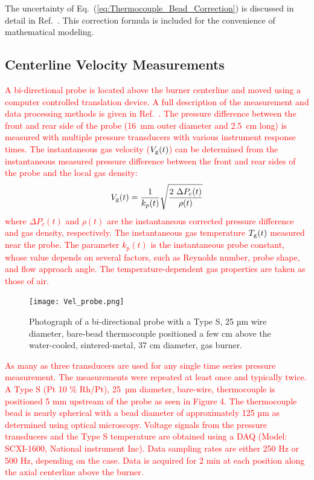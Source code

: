 \documentclass[12pt]{article}
\begin{document}
The uncertainty of Eq.~(\ref{eq:Thermocouple_Bead_Correction}) is discussed in detail in Ref.~\cite{Sung2019}. This correction formula is included for the convenience of mathematical modeling.

\subsection{Centerline Velocity Measurements}
\label{ssec:Velocity_Measurements}
\textcolor{red}{A bi-directional probe is located above the burner centerline and moved using a computer controlled translation device. A full description of the measurement and data processing methods is given in Ref.~\cite{Sung2021}. The pressure difference between the front and rear side of the probe (16~mm outer diameter and 2.5~cm  long) is measured with multiple pressure transducers with various instrument response times. The instantaneous gas velocity ($V_{\rm{g}}(t)$) can be determined from the instantaneous measured pressure difference between the front and rear sides of the probe and the local gas density:}
\begin{equation}\label{eq:Vel_g}
V_{\rm{g}}(t) = \frac{1}{k_p(t)}\sqrt{\frac{2~\Delta P_{c}(t)}{\rho(t)}}
\end{equation}
\textcolor{red}{where $\Delta P_c(t)$ and $\rho(t)$ are the instantaneous corrected pressure difference and gas density, respectively. The instantaneous gas temperature $ {T_{\rm g}(t)}$ measured near the probe. The parameter $k_p(t)$ is the instantaneous probe constant, whose value depends on several factors, such as Reynolds number, probe shape, and flow approach angle. The temperature-dependent gas properties are taken as those of air.}
\begin{figure}[h!]
	\centering
\texttt{[image: Vel\_probe.png]}
	\caption[Photograph of a bi-directional probe]{Photograph of a bi-directional probe with a Type S, 25 µm wire diameter, bare-bead thermocouple positioned a few cm above the water-cooled, sintered-metal, 37 cm diameter, gas burner.}
	\label{fig:Vel_Probe}
\end{figure}
\textcolor{red}{As many as three transducers are used for any single time series pressure measurement. The measurements were repeated at least once and typically twice. A Type S (Pt 10 \% Rh/Pt), 25~µm diameter, bare-wire, thermocouple is positioned 5 mm upstream of the probe as seen in Figure 4. The thermocouple bead is nearly spherical with a bead diameter of approximately 125 µm as determined using optical microscopy. Voltage signals from the pressure transducers and the Type S temperature are obtained using a DAQ (Model: SCXI-1600, National instrument Inc). Data sampling rates are either 250 Hz or 500 Hz, depending on the case. Data is acquired for 2 min at each position along the axial centerline above the burner.}
\end{document}

